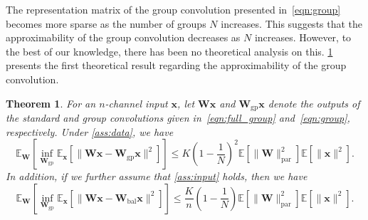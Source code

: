 \documentclass[preprint,12pt,authoryear]{elsarticle}
\numberwithin{equation}{section}
\newtheorem{theorem}{Theorem}[section]
\theoremstyle{remark}
\newcommand\bW{\mathbf{W}}
\newcommand\bx{\mathbf{x}}
\newcommand\bbE{\mathbb{E}}
\newcommand\gp{\mathrm{gp}}
\newcommand\bal{\mathrm{bal}}
\newcommand\param{\mathrm{par}}
\begin{document}
The representation matrix of the group convolution presented in~\eqref{eqn:group} becomes more sparse as the number of groups $N$ increases.
This suggests that the approximability of the group convolution decreases as $N$ increases.
However, to the best of our knowledge, there has been no theoretical analysis on this.
\cref{thm:1} presents the first theoretical result regarding the approximability of the group convolution.

\begin{theorem}
  \label{thm:1}
  For an $n$-channel input $\bx$, let $\bW \bx$ and $\bW_{\gp} \bx$ denote the outputs of the standard and group convolutions given in~\eqref{eqn:full_group} and~\eqref{eqn:group}, respectively.
  Under \cref{ass:data}, we have
  \begin{equation*}
  \bbE_{\bW} \left[ \inf_{\bW_{\gp}} \bbE_{\bx} \left[ \| \bW \bx - \bW_{\gp} \bx \|^2 \right] \right]
  \leq K \left( 1 - \frac{1}{N} \right)^2 \bbE \left[ \| \bW \|_{\param}^2 \right] \bbE \left[ \| \bx \|^2 \right].
  \end{equation*}
  In addition, if we further assume that \cref{ass:input} holds, then we have
  \begin{equation*}
  \bbE_{\bW} \left[ \inf_{\bW_{\gp}} \bbE_{\bx} \left[ \| \bW \bx - \bW_{\bal} \bx \|^2 \right] \right]
  \leq \frac{K}{n} \left( 1 - \frac{1}{N} \right) \bbE \left[ \| \bW \|_{\param}^2 \right] \bbE \left[ \| \bx \|^2 \right].
  \end{equation*}
\end{theorem}
\end{document}
